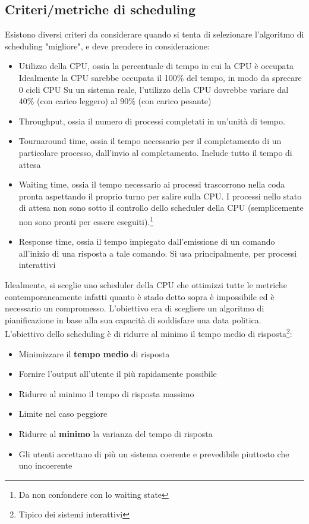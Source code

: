 \documentclass{article}
\begin{document}
\subsection{Criteri/metriche di scheduling}
Esistono diversi criteri da considerare quando si tenta di selezionare l'algoritmo di scheduling "migliore", e deve prendere in considerazione:
\begin{itemize}
    \item Utilizzo della CPU, ossia la percentuale di tempo in cui la CPU è occupata
    Idealmente la CPU sarebbe occupata il 100\% del tempo, in modo da sprecare 0 cicli CPU
    Su un sistema reale, l'utilizzo della CPU dovrebbe variare dal 40\% (con carico leggero) al 90\% (con carico pesante)
    \item Throughput, ossia il numero di processi completati in un'unità di tempo. 
    \item Tournaround time, ossia il tempo necessario per il completamento di un particolare processo, dall'invio al completamento. Include tutto il tempo di attesa
    \item Waiting time, ossia il tempo necessario ai processi trascorrono nella coda pronta aspettando il proprio turno per salire sulla CPU. I processi nello stato di attesa non sono sotto il controllo dello scheduler della CPU (semplicemente non sono pronti per essere eseguiti).\footnote{Da non confondere con lo waiting state}
    \item Response time, ossia il tempo impiegato dall'emissione di un comando all'inizio di una risposta a tale comando. Si usa principalmente, per processi interattivi
\end{itemize}

Idealmente, si sceglie uno scheduler della CPU che ottimizzi tutte le metriche contemporaneamente infatti quanto è stado detto sopra è impossibile ed è necessario un compromesso. L'obiettivo era di scegliere un algoritmo di pianificazione in base alla sua capacità di soddisfare una data politica.\\
L'obiettivo dello scheduling è di ridurre al minimo il tempo medio di risposta\footnote{Tipico dei sistemi interattivi}:
\begin{itemize} 
    \item Minimizzare il \textbf{tempo medio} di risposta
        \item Fornire l'output all'utente il più rapidamente possibile
    \item Ridurre al minimo il tempo di risposta massimo
        \item Limite nel caso peggiore
    \item Ridurre al \textbf{minimo} la varianza del tempo di risposta
        \item Gli utenti accettano di più un sistema coerente e prevedibile piuttosto che uno incoerente
\end{itemize}
\end{document}
